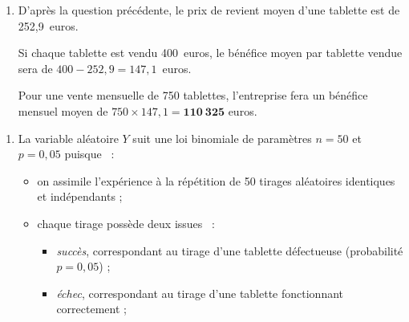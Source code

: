 \begin{corrige}
\begin{enumerate}
{               \par
          }
          \par
          \item %
          D'après la question précédente, le prix de revient moyen d'une tablette est de 252,9~euros.
          \par
          Si chaque tablette est vendu 400~euros, le bénéfice moyen par tablette vendue sera de $400 - 252,9 = 147,1$~euros.
          \par
          Pour une vente mensuelle de 750 tablettes, l'entreprise fera un bénéfice mensuel moyen de $750 \times 147,1 =\bm{110\ 325}$ euros.
          \par
     \end{enumerate}
     \par
     \par
     \begin{enumerate}
          \par
          \item %
          \par
          La variable aléatoire $Y$ suit une loi binomiale de paramètres $n=50$ et $p=0,05$ puisque ~:
          \par
          \begin{itemize}
               \par
               \item on assimile l'expérience à la répétition de 50 tirages aléatoires identiques et indépendants ;
               \par
               \item chaque tirage possède deux issues ~:
               \par
               \begin{itemize}
                    \par
                    \item \textit{succès}, correspondant au tirage d'une tablette défectueuse (probabilité $p=0,05$) ;
                    \item \textit{échec}, correspondant au tirage d'une tablette fonctionnant correctement ;
                    \par
               \end{itemize}

\end{itemize}
\end{enumerate}
\end{corrige}
